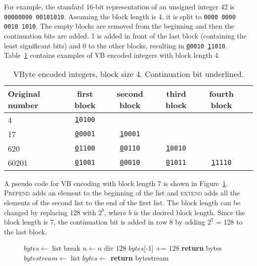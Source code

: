 For example, the standard 16-bit representation of an unsigned integer 42 is \texttt{00000000 00101010}. Assuming the block length is 4, it is split to \texttt{0000 0000 0010 1010}. The empty blocks 
are removed from the beginning and then the continuation bits are added. 1 is added in front of the last block (containing the least significant bits) and 0 to the other blocks, resulting in 
\texttt{\underline{0}0010 \underline{1}1010}. Table~\ref{table:vbytes} contains examples of VB encoded integers with block length 4. 

\begin{table}
\centering
\begin{tabular}{l||c c c c c} 
Original number & first block & second block & third block & fourth block &\\ 
\hline \hline 
4  & \texttt{\underline{1}0100}    &                             &                           &  &  \\
17  & \texttt{\underline{0}0001}   & \texttt{\underline{1}0001}  &                           &  &  \\
620  & \texttt{\underline{0}1100}  & \texttt{\underline{0}0110} & \texttt{\underline{1}0010} &  &  \\
60201 & \texttt{\underline{0}1001} & \texttt{\underline{0}0010} & \texttt{\underline{0}1011} & \texttt{\underline{1}1110} &  \\

\hline
\end{tabular}
\caption{VByte encoded integers, block size 4. Continuation bit underlined.\label{table:vbytes}}
\end{table}

A pseudo code for VB encoding with block length 7 is shown in Figure~\ref{vbyte_enc}. \textsc{Prepend} adds an element to the beginning of the list and 
\textsc{extend} adds all the elements of the second list to the end of the first list. The block length can be changed by replacing 128 with $2^b$, where $b$ is the desired block length. Since the block 
length is 7, the continuation bit is added in row 8 by adding $2^7$ = 128 to the last block.

\begin{figure}[ht]
\centering
  \begin{minipage}{0.5\linewidth}
\begin{algorithmic}[1]
\State $bytes\gets $ list
\State {}
 \State break \EndIf
\State $n\gets n$ div $128$
\EndWhile
\State $bytes$[-1] += $128$
\State \textbf{return} bytes
\EndFunction
\medskip
\medskip
{}
\State $bytestream\gets $ list
\State $bytes \gets$ 
\State {}
\EndFor
\State \textbf{return} bytestream
\EndFunction

\end{algorithmic}
\end{minipage}
 \label{vbyte_enc}
\end{figure}

